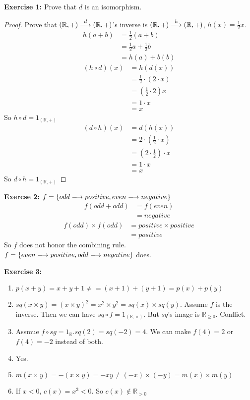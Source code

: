 \documentclass{book}
\begin{document}
\textbf{Exercise 1:} Prove that $d$ is an isomorphism.
\begin{proof}
  Prove that $(\mathbb{R}, +) \xlongrightarrow{d} (\mathbb{R}, +)$'s inverse is
  $(\mathbb{R}, +) \xlongrightarrow{h} (\mathbb{R}, +)$, $h(x) = \frac{1}{2}x$.
  \begin{align*}
    h(a + b) & = \frac{1}{2}(a + b) \\
             & = \frac{1}{2}a + \frac{1}{2} b \\
             & = h(a) + b(b)
  \end{align*}
  \begin{align*}
    (h \circ d)(x) & = h( d(x)) \\
                   & = \frac{1}{2} \cdot (2 \cdot x) \\
                   & = (\frac{1}{2} \cdot 2) x \\
                   & = 1 \cdot x \\
                   & = x
  \end{align*}
  So $h \circ d = 1_{(\mathbb{R}, +)}$
  \begin{align*}
    (d \circ h)(x) & = d( h(x)) \\
                   & = 2 \cdot (\frac{1}{2} \cdot x) \\
                   & = (2 \cdot \frac{1}{2}) \cdot x \\
                   & = 1 \cdot x \\
                   & = x
  \end{align*}
  So $d \circ h = 1_{(\mathbb{R}, +)}$
\end{proof}

\textbf{Exercse 2:} $f = \{odd \xlongrightarrow{} positive, even
\xlongrightarrow{} negative\}$
\begin{align*}
  f(odd + odd) & = f(even) \\
               & = negative
\end{align*}
\begin{align*}
  f(odd) \times f(odd) & = positive \times positive \\
               & = positive
\end{align*}
So $f$ does not honor the combining rule. $f = \{even \xlongrightarrow{} positive,
odd \xlongrightarrow{} negative\}$ does.

\textbf{Exercise 3:}
\begin{enumerate}[label=(\alph*)]
  \item $p(x + y) = x + y + 1 \neq = (x + 1) + (y + 1) = p(x) + p(y)$
  \item $sq(x \times y) = (x \times y)^2 = x^2 \times y^2 = sq(x) \times sq(y)$.
    Assume $f$ is the inverse. Then we can have $sq \circ f = 1_{(\mathbb{R},
    \times)}$. But $sq$'s image is $\mathbb{R}_{\ge 0}$. Conflict.
  \item Assmue $f \circ sg = 1_{\mathbb{R}}$.$sq(2) = sq(-2) = 4$. We can make
    $f(4) = 2$ or $f(4) = -2$ instead of both.
  \item Yes.
  \item $m(x \times y) = -(x \times y) = -xy \neq (-x) \times (-y) = m(x)
    \times m(y)$
  \item If $x < 0$, $c(x) = x^3 < 0$. So $c(x) \notin \mathbb{R}_{>0}$ 
\end{enumerate}
\end{document}
